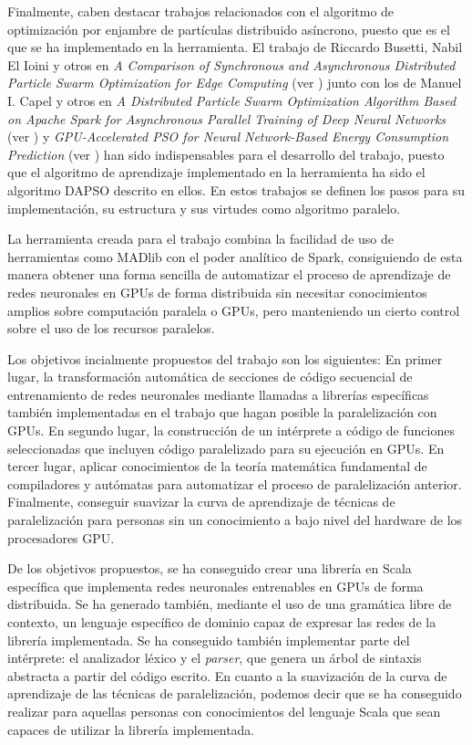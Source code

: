 \vspace{10pt}
Finalmente, caben destacar trabajos relacionados con el algoritmo de optimización por enjambre de partículas distribuido
asíncrono, puesto que es el que se ha implementado en la herramienta. El trabajo de Riccardo Busetti, Nabil El Ioini y otros en
\textit{A Comparison of Synchronous and Asynchronous Distributed Particle Swarm Optimization for Edge Computing} (ver
\cite{dapso}) junto con los de Manuel I. Capel y otros en \textit{A Distributed Particle Swarm Optimization Algorithm Based on
Apache Spark for Asynchronous Parallel Training of Deep Neural Networks} (ver \cite{dapso_2}) y \textit{GPU-Accelerated  PSO 
for Neural Network-Based Energy Consumption Prediction} (ver \cite{dapso_3}) han sido indispensables para el desarrollo del 
trabajo, puesto que el algoritmo de aprendizaje implementado en la herramienta ha sido el algoritmo DAPSO descrito en ellos. En 
estos trabajos se definen los pasos para su implementación, su estructura y sus virtudes como algoritmo paralelo.

\vspace{10pt}
La herramienta creada para el trabajo combina la facilidad de uso de herramientas como MADlib con el poder analítico
de Spark, consiguiendo de esta manera obtener una forma sencilla de automatizar el proceso de aprendizaje de redes
neuronales en GPUs de forma distribuida sin necesitar conocimientos amplios sobre computación paralela o GPUs, pero
manteniendo un cierto control sobre el uso de los recursos paralelos.

\vspace{10pt}
Los objetivos incialmente propuestos del trabajo son los siguientes: En primer lugar, la transformación automática de 
secciones de código secuencial de entrenamiento de redes neuronales mediante llamadas a librerías específicas también 
implementadas en el trabajo que hagan posible la paralelización con GPUs. En segundo lugar, la construcción de un 
intérprete a código de funciones seleccionadas que incluyen código paralelizado para su ejecución en GPUs. En tercer
lugar, aplicar conocimientos de la teoría matemática fundamental de compiladores y autómatas para automatizar el 
proceso de paralelización anterior. Finalmente, conseguir suavizar la curva de aprendizaje de técnicas de 
paralelización para personas sin un conocimiento a bajo nivel del hardware de los procesadores GPU.

\vspace{10pt}
De los objetivos propuestos, se ha conseguido crear una librería en Scala específica que implementa redes neuronales
entrenables en GPUs de forma distribuida. Se ha generado también, mediante el uso de una gramática libre de contexto,
un lenguaje específico de dominio capaz de expresar las redes de la librería implementada. Se ha conseguido también
implementar parte del intérprete: el analizador léxico y el \textit{parser}, que genera un árbol de sintaxis abstracta
a partir del código escrito. En cuanto a la suavización de la curva de aprendizaje de las técnicas de paralelización,
podemos decir que se ha conseguido realizar para aquellas personas con conocimientos del lenguaje Scala que sean capaces
de utilizar la librería implementada.

